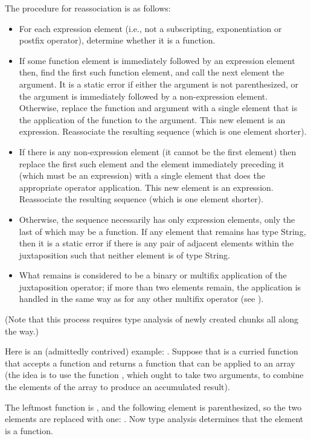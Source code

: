 The procedure for reassociation is as follows:
\begin{itemize}
\item For each expression element (i.e., not a subscripting, exponentiation or
postfix operator), determine whether it is a function.
\item If some function element is immediately followed by an expression element
then, find the first such function element, and call the next element the
argument.  It is a static error if either the argument is not parenthesized,
or the argument is immediately followed by a non-expression element.  Otherwise,
replace the function and argument with a single element that is the application
of the function to the argument.  This new element is an expression.
Reassociate the resulting sequence (which is one element shorter).
\item If there is any non-expression element (it cannot be the first element)
then replace the first such element and the element immediately preceding it
(which must be an expression) with a single element that does the appropriate
operator application.  This new element is an expression.  Reassociate the
resulting sequence (which is one element shorter).
\item Otherwise, the sequence necessarily has only expression elements,
only the last of which may be a function.
If any element that remains has type String, then it is a static error
if there is any pair of adjacent elements within the juxtaposition
such that neither element is of type String.
\item
What remains is considered to be a binary or multifix application of the juxtaposition
operator; if more than two elements remain, the application is handled in the same
way as for any other multifix operator (see ).
\end{itemize}
(Note that this process requires type analysis of newly created chunks
all along the way.)

Here is an (admittedly contrived) example:
.
Suppose that  is a curried function
that accepts a function  and returns a function that can
be applied to an array  (the idea is to use the function ,
which ought to take two arguments, to combine the elements of the
array to produce an accumulated result).

The leftmost function is , and the following element 
is parenthesized, so the two elements are replaced with one:
.
Now type analysis determines that the element 
is a function.

